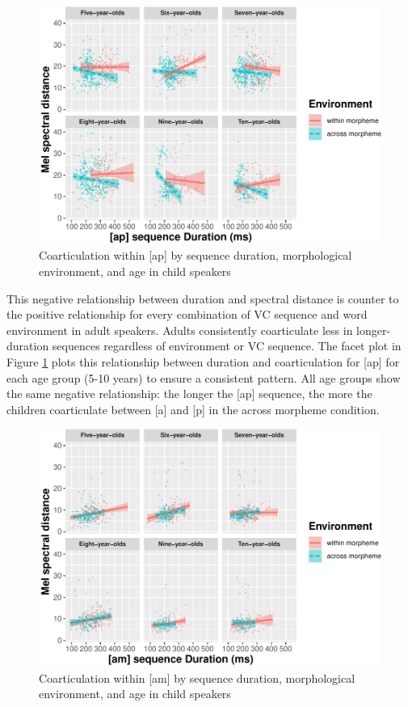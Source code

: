 \documentclass[a4paper,man,floatsintext,natbib,donotrepeattitle, apacite]{apa6}
\begin{document}
\begin{figure}
\centering
\includegraphics{3_ch3_results_files/figure-latex/child-facet-ap-1.pdf}
\caption{\label{fig:child-facet-ap}Coarticulation within {[}ap{]} by sequence duration, morphological environment, and age in child speakers}
\end{figure}

This negative relationship between duration and spectral distance is counter to the positive relationship for every combination of VC sequence and word environment in adult speakers. Adults consistently coarticulate less in longer-duration sequences regardless of environment or VC sequence. The facet plot in Figure \ref{fig:child-facet-ap} plots this relationship between duration and coarticulation for {[}ap{]} for each age group (5-10 years) to ensure a consistent pattern. All age groups show the same negative relationship: the longer the {[}ap{]} sequence, the more the children coarticulate between {[}a{]} and {[}p{]} in the across morpheme condition.

\begin{figure}
\centering
\includegraphics{3_ch3_results_files/figure-latex/child-facet-am-1.pdf}
\caption{\label{fig:child-facet-am}Coarticulation within {[}am{]} by sequence duration, morphological environment, and age in child speakers}
\end{figure}
\end{document}
